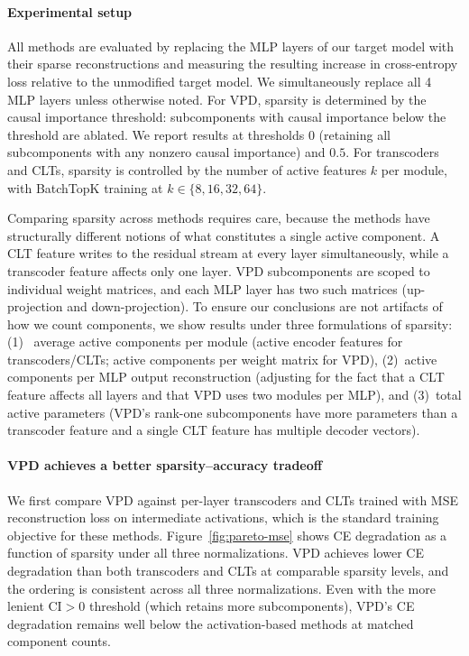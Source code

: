 \documentclass{article}
\begin{document}
\paragraph{Experimental setup}
All methods are evaluated by replacing the MLP layers of our target model with their sparse reconstructions and measuring the resulting increase in cross-entropy loss relative to the unmodified target model. We simultaneously replace all 4 MLP layers unless otherwise noted. For VPD, sparsity is determined by the causal importance threshold: subcomponents with causal importance below the threshold are ablated. We report results at thresholds $0$ (retaining all subcomponents with any nonzero causal importance) and $0.5$. For transcoders and CLTs, sparsity is controlled by the number of active features $k$ per module, with BatchTopK training at $k \in \{8, 16, 32, 64\}$.

Comparing sparsity across methods requires care, because the methods have structurally different notions of what constitutes a single active component. A CLT feature writes to the residual stream at every layer simultaneously, while a transcoder feature affects only one layer. VPD subcomponents are scoped to individual weight matrices, and each MLP layer has two such matrices (up-projection and down-projection). To ensure our conclusions are not artifacts of how we count components, we show results under three formulations of sparsity: (1)~ average active components per module (active encoder features for transcoders/CLTs; active components per weight matrix for VPD), (2)~active components per MLP output reconstruction (adjusting for the fact that a CLT feature affects all layers and that VPD uses two modules per MLP), and (3)~total active parameters (VPD's rank-one subcomponents have more parameters than a transcoder feature and a single CLT feature has multiple decoder vectors).

\paragraph{VPD achieves a better sparsity--accuracy tradeoff}

We first compare VPD against per-layer transcoders and CLTs trained with MSE reconstruction loss on intermediate activations, which is the standard training objective for these methods. Figure~\ref{fig:pareto-mse} shows CE degradation as a function of sparsity under all three normalizations. VPD achieves lower CE degradation than both transcoders and CLTs at comparable sparsity levels, and the ordering is consistent across all three normalizations. Even with the more lenient CI$>$0 threshold (which retains more subcomponents), VPD's CE degradation remains well below the activation-based methods at matched component counts.
\end{document}
